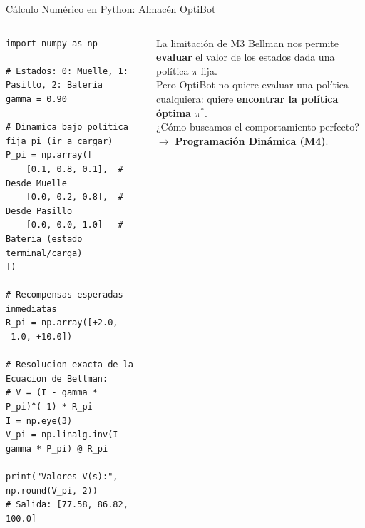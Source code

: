 \begin{frame}[fragile]{Cálculo Numérico en Python: Almacén OptiBot}
  \begin{columns}[T,onlytextwidth]
\begin{lstlisting}[style=rlcode]
import numpy as np

# Estados: 0: Muelle, 1: Pasillo, 2: Bateria
gamma = 0.90

# Dinamica bajo politica fija pi (ir a cargar)
P_pi = np.array([
    [0.1, 0.8, 0.1],  # Desde Muelle
    [0.0, 0.2, 0.8],  # Desde Pasillo
    [0.0, 0.0, 1.0]   # Bateria (estado terminal/carga)
])

# Recompensas esperadas inmediatas
R_pi = np.array([+2.0, -1.0, +10.0])

# Resolucion exacta de la Ecuacion de Bellman:
# V = (I - gamma * P_pi)^(-1) * R_pi
I = np.eye(3)
V_pi = np.linalg.inv(I - gamma * P_pi) @ R_pi

print("Valores V(s):", np.round(V_pi, 2))
# Salida: [77.58, 86.82, 100.0]
\end{lstlisting}
      \begin{alertblock}{La limitación de M3}
        Bellman nos permite \textbf{evaluar} el valor de los estados dada una política $\pi$ fija.\\
        \vspace{0.2cm}
        Pero OptiBot no quiere evaluar una política cualquiera: quiere \textbf{encontrar la política óptima $\pi^*$}.\\
        \vspace{0.2cm}
        ¿Cómo buscamos el comportamiento perfecto? $\to$ \textbf{Programación Dinámica (M4)}.
      \end{alertblock}
  \end{columns}
\end{frame}
